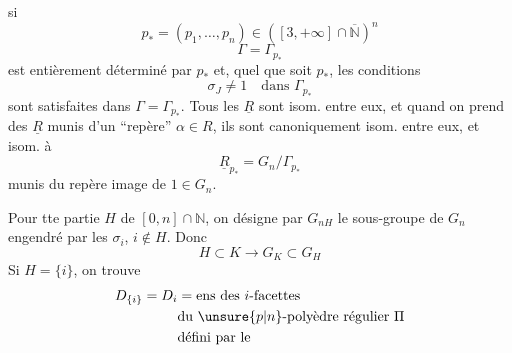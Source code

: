 si
\[
p_*=(p_1,\ldots,p_n)\in([3,+\infty]\cap\overline{\mathbb{N}})^n
\]
\[
\Gamma=\Gamma_{p_*}
\]
est entièrement déterminé par $p_*$ et, quel que soit $p_*$, les conditions 
\[
\sigma_J\neq1\quad\text{dans }\Gamma_{p_*}
\]
sont satisfaites dans $\Gamma=\Gamma_{p_*}$. Tous les $\underline{R}$ sont isom. entre eux, et quand on prend des $\underline{R}$ munis d'un ``repère'' $\alpha\in R$, ils sont canoniquement isom. entre eux, et  isom. à 
\[
\underline{R}_{p_*}=G_n/\Gamma_{p_*}
\]
munis du repère image de $1\in G_n$.

Pour tte partie $H$ de  $[0,n]\cap\mathbb{N}$, on désigne par $G_{nH}$ le sous-groupe de $G_n$ engendré par les $\sigma_i$, $i\notin H$. Donc
\[
H\subset K\longrightarrow G_K\subset G_H
\]
Si $H=\{i\}$, on trouve
\[
\begin{aligned}
D_{\{i\}}=D_i&=\text{ens des }i\text{-facettes}\\
&\text{du }\unsure{p|n}\text{-polyèdre régulier }\Pi\\
&\text{défini par le}
\end{aligned}
\]
